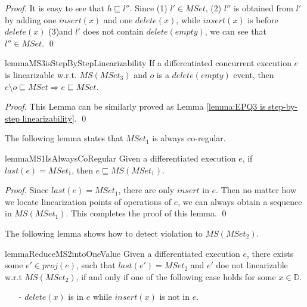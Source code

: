 {\begin {proof}
It is easy to see that $h \sqsubseteq l''$. Since (1) $l' \in \textit{MSet}$, (2) $l''$ is obtained from $l'$ by adding one $\textit{insert}(x)$ and one $\textit{delete}(x)$, while $\textit{insert}(x)$ is before $\textit{delete}(x)$ (3)and $l'$ does not contain $\textit{delete}(\textit{empty})$, we can see that $l'' \in \textit{MSet}$. \qed
\end {proof}


\begin{restatable}{lemma}{MS3isStepByStepLinearizability}
\label{lemma:MS3 is step-by-step linearizability}
If a differentiated concurrent execution $e$ is linearizable w.r.t. $\textit{MS}(\textit{MSet}_3)$ and $o$ is a $\textit{delete}(\textit{empty})$ event, then $e \setminus o \sqsubseteq \textit{MSet} \Rightarrow e \sqsubseteq \textit{MSet}$.
\end{restatable}

\begin {proof}
This Lemma can be similarly proved as Lemma \ref{lemma:EPQ3 is step-by-step linearizability}. \qed
\end {proof}

The following lemma states that $\textit{MSet}_1$ is always co-regular.

\begin{restatable}{lemma}{MS1IsAlwaysCoRegular}
\label{lemma:MS1 is always co-regular}
Given a differentiated execution $e$, if $\textit{last}(e) = \textit{MSet}_1$, then $e \sqsubseteq \textit{MS}(\textit{MSet}_1)$.
\end{restatable}

\begin {proof}
Since $\textit{last}(e) = \textit{MSet}_1$, there are only $\textit{insert}$ in $e$. Then no matter how we locate linearization points of operations of $e$, we can always obtain a sequence in $\textit{MS}(\textit{MSet}_1)$. This completes the proof of this lemma. \qed
\end {proof}

The following lemma shows how to detect violation to $\textit{MS}(\textit{MSet}_2)$.

\begin{restatable}{lemma}{ReduceMS2intoOneValue}
\label{lemma:reduce MS2 into one value}
Given a differentiated execution $e$, there exists some $e' \in \textit{proj}(e)$, such that $\textit{last}(e') = \textit{MSet}_2$ and $e'$ doe not linearizable w.r.t $\textit{MS}(\textit{MSet}_2)$, if and only if one of the following case holds for some $x \in \mathbb{D}$.
\begin{itemize}
\setlength{\itemsep}{0.5pt}
\item[-] $\textit{delete}(x)$ is in $e$ while $\textit{insert}(x)$ is not in $e$.


\end{itemize}
\end{restatable}}
